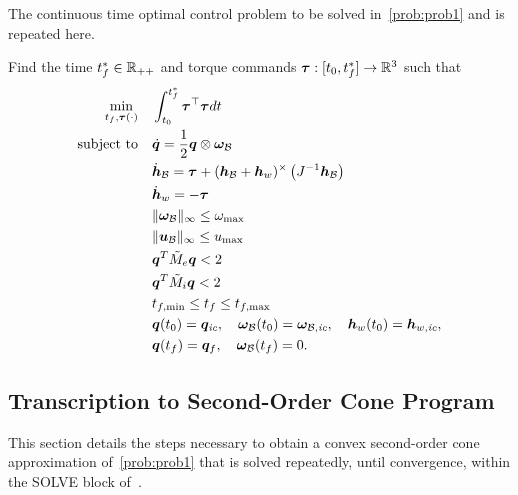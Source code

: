 \documentclass[10pt]{article}
\begin{document}
The continuous time optimal control problem to be solved in~\ref{prob:prob1} and is repeated here.
\begin{problem}\label{prob:prob1}
Find the time $t_f^*\in{\mathbb{R}}_{++}$ and torque commands $\bm{\tau} : [t_0,t_f^*] \rightarrow {\mathbb{R}}^3$ such that
\begin{subequations}
\begin{align}
\min_{t_f,\bm{\tau}(\cdot)} &\quad \int_{t_0}^{t_f^*} \bm{\tau}^{\top}\bm{\tau} dt \label{eq:prob_cost}\\
\text{subject to} &\quad \dot{\bm{q}} = \frac{1}{2} \bm{q} \otimes \bm{\omega}_{\mathcal{B}} \label{eq:prob_b}\\
&\quad \dot{\bm{h}}_{\mathcal{B}} = \bm{\tau} + (\bm{h}_{\mathcal{B}}+\bm{h}_w)^{\times} \left( J^{-1} \bm{h}_{\mathcal{B}} \right)\label{eq:prob_c}\\
&\quad \dot{\bm{h}}_w = -\bm{\tau} \\
&\quad \| \bm{\omega}_{\mathcal{B}} \|_{\infty} \leq \omega_{\max} \label{eq:prob_d}\\
&\quad \| \bm{u}_{\mathcal{B}} \|_{\infty} \leq u_{\max} \label{eq:prob_e}\\
&\quad \bm{q}^T \tilde{M}_e \bm{q} < 2 \label{eq:prob_f}\\
&\quad \bm{q}^T \tilde{M}_i \bm{q} < 2 \label{eq:prob_g}\\
&\quad t_{f,\min} \leq t_f \leq t_{f,\max} \label{eq:prob_h}\\
&\quad \bm{q}(t_0) = \bm{q}_\textit{ic},\quad \bm{\omega}_{\mathcal{B}}(t_0)=\bm{\omega}_{\mathcal{B},\textit{ic}},\quad \bm{h}_w(t_0)=\bm{h}_{w,\textit{ic}}, \\
&\quad \bm{q}(t_f) = \bm{q}_f,\quad \bm{\omega}_{\mathcal{B}}(t_f) = 0.\label{eq:prob_i}
\end{align}
\end{subequations}
\end{problem} 

\subsection*{Transcription to Second-Order Cone Program}
This section details the steps necessary to obtain a convex second-order cone approximation of~\ref{prob:prob1} that is solved repeatedly, until convergence, within the SOLVE block of~.
\end{document}
